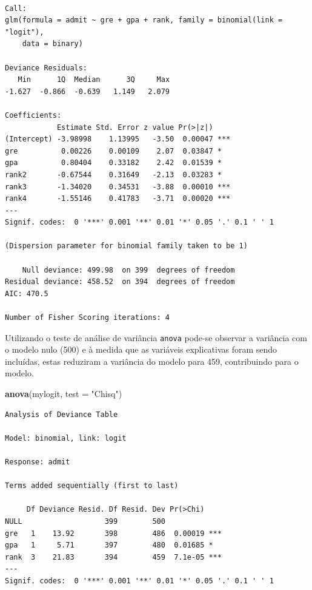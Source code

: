 \documentclass[12pt,brazil,oneside]{book}
\newenvironment{Shaded}{\begin{snugshade}}{\end{snugshade}}
\newcommand{\DataTypeTok}[1]{\textcolor[rgb]{0.13,0.29,0.53}{#1}}
\newcommand{\KeywordTok}[1]{\textcolor[rgb]{0.13,0.29,0.53}{\textbf{#1}}}
\newcommand{\NormalTok}[1]{#1}
\newcommand{\StringTok}[1]{\textcolor[rgb]{0.31,0.60,0.02}{#1}}
\begin{document}
\begin{verbatim}

Call:
glm(formula = admit ~ gre + gpa + rank, family = binomial(link = "logit"), 
    data = binary)

Deviance Residuals: 
   Min      1Q  Median      3Q     Max  
-1.627  -0.866  -0.639   1.149   2.079  

Coefficients:
            Estimate Std. Error z value Pr(>|z|)    
(Intercept) -3.98998    1.13995   -3.50  0.00047 ***
gre          0.00226    0.00109    2.07  0.03847 *  
gpa          0.80404    0.33182    2.42  0.01539 *  
rank2       -0.67544    0.31649   -2.13  0.03283 *  
rank3       -1.34020    0.34531   -3.88  0.00010 ***
rank4       -1.55146    0.41783   -3.71  0.00020 ***
---
Signif. codes:  0 '***' 0.001 '**' 0.01 '*' 0.05 '.' 0.1 ' ' 1

(Dispersion parameter for binomial family taken to be 1)

    Null deviance: 499.98  on 399  degrees of freedom
Residual deviance: 458.52  on 394  degrees of freedom
AIC: 470.5

Number of Fisher Scoring iterations: 4
\end{verbatim}

Utilizando o teste de análise de variância \texttt{anova} pode-se observar a variância com o modelo nulo (500) e à medida que as variáveis explicativas foram sendo incluídas, estas reduziram a variância do modelo para 459, contribuindo para o modelo.

\begin{Shaded}
\begin{Highlighting}[]
\KeywordTok{anova}\NormalTok{(mylogit, }\DataTypeTok{test =} \StringTok{"Chisq"}\NormalTok{)}
\end{Highlighting}
\end{Shaded}

\begin{verbatim}
Analysis of Deviance Table

Model: binomial, link: logit

Response: admit

Terms added sequentially (first to last)

     Df Deviance Resid. Df Resid. Dev Pr(>Chi)    
NULL                   399        500             
gre   1    13.92       398        486  0.00019 ***
gpa   1     5.71       397        480  0.01685 *  
rank  3    21.83       394        459  7.1e-05 ***
---
Signif. codes:  0 '***' 0.001 '**' 0.01 '*' 0.05 '.' 0.1 ' ' 1
\end{verbatim}
\end{document}
